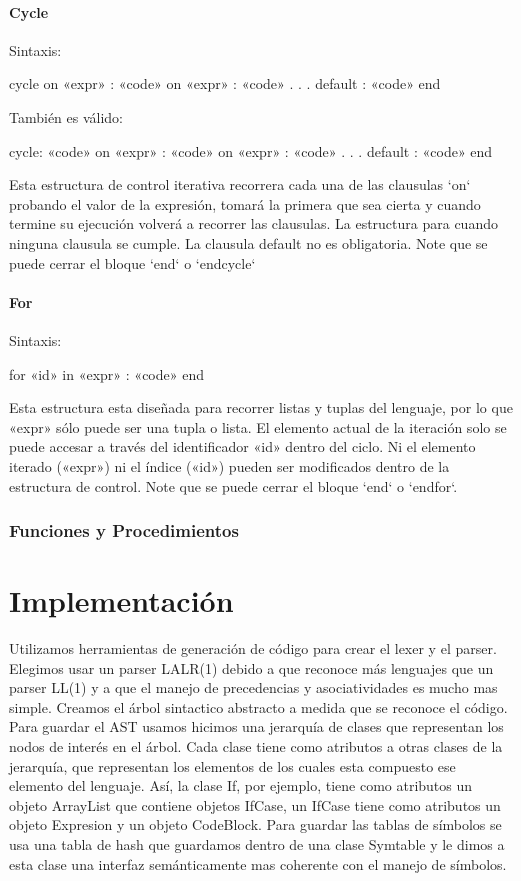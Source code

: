 \documentclass[12pt, spanish]{report}
\begin{document}
\subsubsection{Cycle}
Sintaxis:

   cycle
      on «expr» :
          «code»
      on «expr» :
          «code»
      .
      .
      .
      default :
          «code»
   end

También es válido:

   cycle:
      «code»
      on «expr» :
          «code»
      on «expr» :
          «code»
      .
      .
      .
      default :
          «code»
   end

Esta estructura de control iterativa recorrera cada una de las clausulas
`on` probando el valor de la expresión, tomará la primera que sea cierta
y cuando termine su ejecución volverá a recorrer las clausulas. La
estructura para cuando ninguna clausula se cumple. La clausula default no es obligatoria.%
Note que se puede cerrar el bloque `end` o `endcycle`

\subsubsection{For}
Sintaxis:

   for «id» in «expr» :
       «code»
   end

Esta estructura esta diseñada para recorrer listas y tuplas del
lenguaje, por lo que «expr» sólo puede ser una tupla o lista. El
elemento actual de la iteración solo se puede accesar a través del
identificador «id» dentro del ciclo. Ni el elemento iterado («expr») ni
el índice («id») pueden ser modificados dentro de la estructura de control.%
Note que se puede cerrar el bloque `end` o `endfor`.

\subsection{Funciones y Procedimientos}
\label{sec:func}


\chapter{Implementación}
\label{chap:impl}
Utilizamos herramientas de generación de código para crear el lexer y
el parser. Elegimos usar un parser LALR(1) debido a que reconoce más
lenguajes que un parser LL(1) y a que el manejo de precedencias y
asociatividades es mucho mas simple.%
Creamos el árbol sintactico abstracto a medida que se reconoce el
código. Para guardar el AST usamos hicimos una jerarquía
de clases que representan los nodos de interés en el árbol. Cada clase
tiene como atributos a otras clases de la jerarquía, que representan los
elementos de los cuales esta compuesto ese elemento del lenguaje. Así,
la clase If, por ejemplo, tiene como atributos un objeto ArrayList que
contiene objetos IfCase, un IfCase tiene como atributos un objeto
Expresion y un objeto CodeBlock.%
Para guardar las tablas de símbolos se usa una tabla de hash que
guardamos dentro de una clase Symtable y le dimos a esta clase una interfaz
semánticamente mas coherente con el manejo de símbolos.
\end{document}
